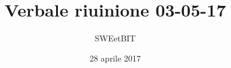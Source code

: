 


\usepackage{ragged2e}

\title{\textbf{Verbale riuinione 03-05-17}}
\author{SWEetBIT}

\date{28 aprile 2017}




\makeFrontPage
%
\tableofcontents





